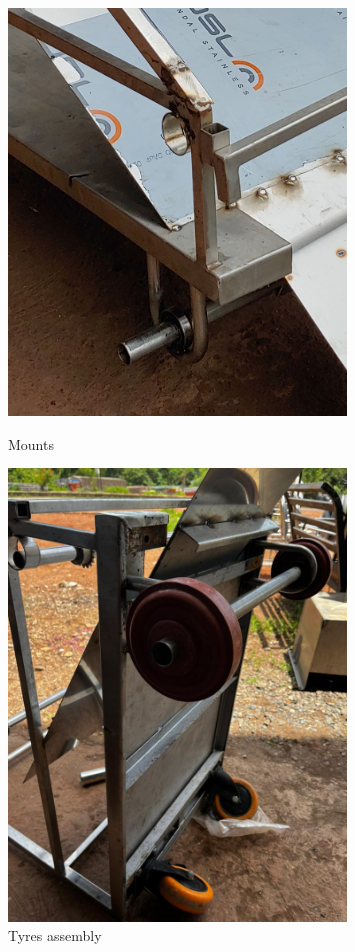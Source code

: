 \begin{figure}[H]
\begin{minipage}{0.39\textwidth}
      \includegraphics[width=0.8\textwidth]{mounts.jpg}
      \caption{Mounts}
      \label{fig:Mounts}
    \end{minipage}
\hfill
     \begin{minipage}{0.36\textwidth}
    \centering
      \includegraphics[width=0.8\textwidth]{tyres ass.jpg}
      \caption{Tyres assembly}
      \label{fig:Tyres assembly}
    \end{minipage}
\end{figure}





